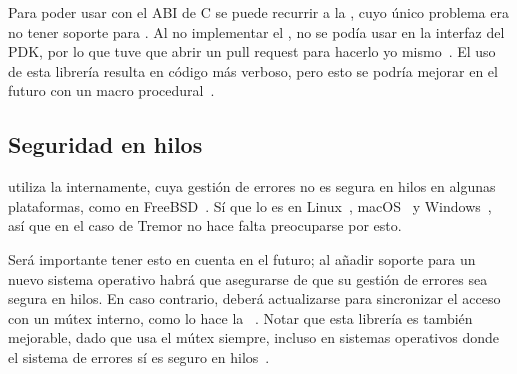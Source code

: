 %

Para poder usar  con el ABI de C se puede recurrir a la \crate
{}, cuyo único problema era no tener soporte para \abistable.
Al no implementar el \trait {}, no se podía usar en la interfaz
del PDK, por lo que tuve que abrir un pull request para hacerlo yo
mismo~\cite{asyncfficontrib}. El uso de esta librería resulta en código más
verboso, pero esto se podría mejorar en el futuro con un macro
procedural~\cite{asyncffimacro}.

\subsection{Seguridad en hilos}

\abistable utiliza la \crate {} internamente, cuya gestión
de errores no es segura en hilos en algunas plataformas, como  en
FreeBSD~\cite{thsafe_libloading}\cite{thsafe_openbsd}. Sí que lo es en
Linux~\cite{thsafe_linux}, macOS~\cite{thsafe_macos} y Windows~\cite{thsafe_ms},
así que en el caso de Tremor no hace falta preocuparse por esto.

Será importante tener esto en cuenta en el futuro; al añadir soporte para un
nuevo sistema operativo habrá que asegurarse de que su gestión de errores sea
segura en hilos. En caso contrario, deberá actualizarse  para
sincronizar el acceso con un mútex interno, como lo hace la \crate
{}~\cite{thsafe_dlopen}. Notar que esta librería es también
mejorable, dado que usa el mútex siempre, incluso en sistemas operativos donde
el sistema de errores sí es seguro en hilos~\cite{thsafe_dlopen_issue}.

